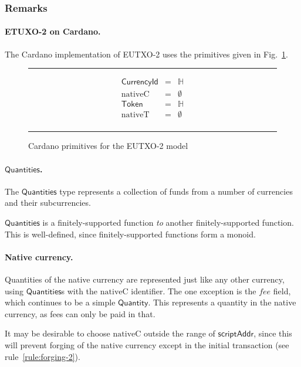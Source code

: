 \documentclass[a4paper]{article}
\newcommand{\s}{\textsf}  %
\newcommand{\msf}[1]{\ensuremath{\mathsf{#1}}}
\newcommand{\mi}[1]{\ensuremath{\mathit{#1}}}
\newcommand\rfskip{7pt}
\newenvironment{ruledfigure}[1]{\begin{figure}[#1]\hrule\vspace{\rfskip}}{\vspace{\rfskip}\hrule\end{figure}}
\newcommand{\scriptAddr}{\msf{scriptAddr}}
\newcommand{\fee}{\mi{fee}}
\newcommand{\qty}{\ensuremath{\s{Quantity}}}
\newcommand{\token}{\ensuremath{\s{Token}}}
\newcommand{\currency}{\ensuremath{\s{CurrencyId}}}
\newcommand{\nativeCur}{\ensuremath{\mathrm{nativeC}}}
\newcommand{\nativeTok}{\ensuremath{\mathrm{nativeT}}}
\newcommand{\qtymap}{\ensuremath{\s{Quantities}}}
\renewcommand\H{\ensuremath{\mathbb{H}}}
\newcommand{\emptyBs}{\ensuremath{\emptyset}}
\begin{document}
\subsubsection{Remarks}
\paragraph{ETUXO-2 on Cardano.}
The Cardano implementation of EUTXO-2 uses the primitives given in
Fig.~\ref{fig:eutxo-2-types-cardano}.
\begin{ruledfigure}{H}
  \begin{displaymath}
    \begin{array}{rll}
      \currency  &=& \H\\
      \nativeCur &=& \emptyBs\\
      \token     &=& \H\\
      \nativeTok &=& \emptyBs\\
    \end{array}
  \end{displaymath}
  \caption{Cardano primitives for the EUTXO-2 model}
  \label{fig:eutxo-2-types-cardano}
\end{ruledfigure}

\paragraph{\qtymap{}. }
The \qtymap{} type represents a collection of funds from a
number of currencies and their subcurrencies.

\qtymap{} is a finitely-supported function \emph{to} another finitely-supported
function. This is well-defined, since finitely-supported functions form a monoid.

\paragraph{Native currency. }
Quantities of the native currency are represented just like any other currency,
using \qtymap{}s with the \nativeCur{} identifier. The one exception is the
\fee{} field, which continues to be a simple \qty{}. This represents a quantity
in the native currency, as fees can only be paid in that.

It may be desirable to choose \nativeCur{} outside the range
of \scriptAddr{}, since this will prevent forging of the native currency
except in the initial transaction (see rule~\ref{rule:forging-2}).
\end{document}
